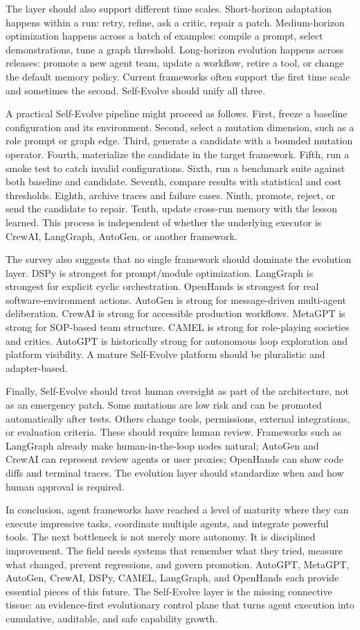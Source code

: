 The layer should also support different time scales.  Short-horizon adaptation happens within a run: retry, refine, ask a critic, repair a patch.  Medium-horizon optimization happens across a batch of examples: compile a prompt, select demonstrations, tune a graph threshold.  Long-horizon evolution happens across releases: promote a new agent team, update a workflow, retire a tool, or change the default memory policy.  Current frameworks often support the first time scale and sometimes the second.  Self-Evolve should unify all three.

A practical Self-Evolve pipeline might proceed as follows.  First, freeze a baseline configuration and its environment.  Second, select a mutation dimension, such as a role prompt or graph edge.  Third, generate a candidate with a bounded mutation operator.  Fourth, materialize the candidate in the target framework.  Fifth, run a smoke test to catch invalid configurations.  Sixth, run a benchmark suite against both baseline and candidate.  Seventh, compare results with statistical and cost thresholds.  Eighth, archive traces and failure cases.  Ninth, promote, reject, or send the candidate to repair.  Tenth, update cross-run memory with the lesson learned.  This process is independent of whether the underlying executor is CrewAI, LangGraph, AutoGen, or another framework.

The survey also suggests that no single framework should dominate the evolution layer.  DSPy is strongest for prompt/module optimization.  LangGraph is strongest for explicit cyclic orchestration.  OpenHands is strongest for real software-environment actions.  AutoGen is strong for message-driven multi-agent deliberation.  CrewAI is strong for accessible production workflows.  MetaGPT is strong for SOP-based team structure.  CAMEL is strong for role-playing societies and critics.  AutoGPT is historically strong for autonomous loop exploration and platform visibility.  A mature Self-Evolve platform should be pluralistic and adapter-based.

Finally, Self-Evolve should treat human oversight as part of the architecture, not as an emergency patch.  Some mutations are low risk and can be promoted automatically after tests.  Others change tools, permissions, external integrations, or evaluation criteria.  These should require human review.  Frameworks such as LangGraph already make human-in-the-loop nodes natural; AutoGen and CrewAI can represent review agents or user proxies; OpenHands can show code diffs and terminal traces.  The evolution layer should standardize when and how human approval is required.

In conclusion, agent frameworks have reached a level of maturity where they can execute impressive tasks, coordinate multiple agents, and integrate powerful tools.  The next bottleneck is not merely more autonomy.  It is disciplined improvement.  The field needs systems that remember what they tried, measure what changed, prevent regressions, and govern promotion.  AutoGPT, MetaGPT, AutoGen, CrewAI, DSPy, CAMEL, LangGraph, and OpenHands each provide essential pieces of this future.  The Self-Evolve layer is the missing connective tissue: an evidence-first evolutionary control plane that turns agent execution into cumulative, auditable, and safe capability growth.
